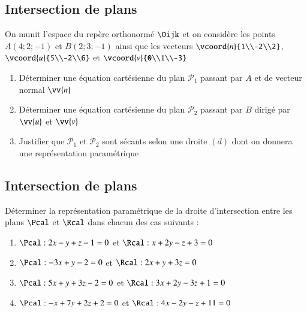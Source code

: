 \documentclass[oneside,12pt]{article}          %
\begin{document}
\subsection{Intersection de plans}
On munit l'espace du repère orthonormé $\Oijk$ et on considère les points $A(4;2;-1)$ et $B(2;3;-1)$ ainsi que les vecteurs $\vcoord{n}{1\\-2\\2}$, $\vcoord{u}{5\\-2\\6}$ et $\vcoord{v}{0\\1\\-3}$
    \begin{enumerate}
        \item Déterminer une équation cartésienne du plan $\mathscr{P}_1$ passant par $A$ et de vecteur normal $\vv{n}$
        \item Déterminer une équation cartésienne du plan $\mathscr{P}_2$ passant par $B$ dirigé par $\vv{u}$ et $\vv{v}$
        \item Justifier que $\mathscr{P}_1$ et $\mathscr{P}_2$ sont sécants selon une droite $(d)$ dont on donnera une représentation paramétrique     
    \end{enumerate}



\subsection{Intersection de plans}
Déterminer la représentation paramétrique de la droite d'intersection entre les plans $\Pcal$ et $\Rcal$ dans chacun des cas suivants :
\begin{enumerate}
	\item $\Pcal:2x-y+z-1=0$ \quad et \quad $\Rcal:x+2y-z+3=0$
	\item $\Pcal:-3x+y-2=0$ \quad et \quad $\Rcal:2x+y+3z=0$
	\item $\Pcal:5x+y+3z-2=0$ \quad et \quad $\Rcal:3x+2y-3z+1=0$
	\item $\Pcal:-x+7y+2z+2=0$ \quad et \quad $\Rcal:4x-2y-z+11=0$
\end{enumerate}
\end{document}
